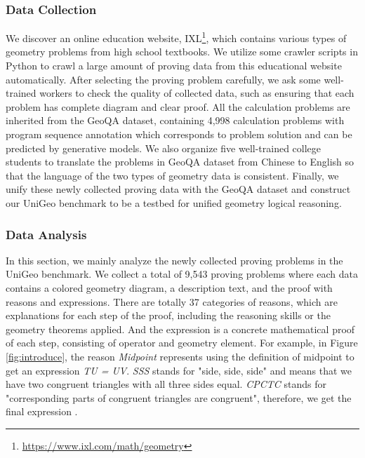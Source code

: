 \documentclass[11pt]{article}
\begin{document}
\subsubsection{Data Collection}

We discover an online education website, IXL\footnote{\href{https://www.ixl.com/math/geometry}{https://www.ixl.com/math/geometry}}, which contains various types of geometry problems from high school textbooks. 
We utilize some crawler scripts in Python to crawl a large amount of proving data from this educational website automatically.
After selecting the proving problem carefully, we ask some well-trained workers to check the quality of collected data, such as ensuring that each problem has complete diagram and clear proof.
All the calculation problems are inherited from the GeoQA dataset, containing 4,998 calculation problems with program sequence annotation which corresponds to problem solution and can be predicted by generative models. 
We also organize five well-trained college students to translate the problems in GeoQA dataset from Chinese to English so that the language of the two types of geometry data is consistent.
Finally, we unify these newly collected proving data with the GeoQA dataset and construct our UniGeo benchmark to be a testbed for unified geometry logical reasoning. 





\subsubsection{Data Analysis}
\label{data_analysis}



In this section, we mainly analyze the newly collected proving problems in the UniGeo benchmark.
We collect a total of 9,543 proving problems where each data contains a colored geometry diagram, a description text, and the proof with reasons and expressions.
There are totally 37 categories of reasons, which are explanations for each step of the proof, including the reasoning skills or the geometry theorems applied. And the expression is a concrete mathematical proof of each step, consisting of operator and geometry element.
For example, in Figure \ref{fig:introduce}, the reason \textit{Midpoint} represents using the definition of midpoint to get an expression \textit{TU = UV}. \textit{SSS} stands for "side, side, side" and means that we have two congruent triangles with all three sides equal. \textit{CPCTC} stands for "corresponding parts of congruent triangles are congruent", therefore, we get the final expression .
\end{document}
